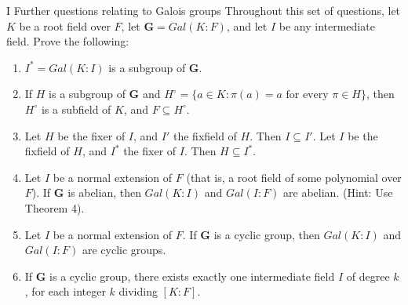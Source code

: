 \begin{exercise}{I Further questions relating to Galois groups}
Throughout this set of questions, let $K$ be a root field over $F$, let $\mathbf{G}=Gal(K:F)$, and let $I$ be any intermediate field. Prove the following:
\begin{enumerate}
    \item $I^\ast=Gal(K:I)$ is a subgroup of $\mathbf{G}$.
    \item If $H$ is a subgroup of $\mathbf{G}$ and $H^\circ=\{a\in K: \pi(a)=a\text{ for every }\pi\in H\}$, then $H^\circ$ is a subfield of $K$, and $F\subseteq H^\circ$.
    \item Let $H$ be the fixer of $I$, and $I'$ the fixfield of $H$. Then $I\subseteq I'$. Let $I$ be the fixfield of $H$, and $I^\ast$ the fixer of $I$. Then $H\subseteq I^\ast$.
    \item Let $I$ be a normal extension of $F$ (that is, a root field of some polynomial over $F$). If $\mathbf{G}$ is abelian, then $Gal(K:I)$ and $Gal(I:F)$ are abelian. (Hint: Use Theorem 4).
     \item Let $I$ be a normal extension of $F$. If $\mathbf{G}$ is a cyclic group, then $Gal(K:I)$ and $Gal(I:F)$ are cyclic groups.
     \item If $\mathbf{G}$ is a cyclic group, there exists exactly one intermediate field $I$ of degree $k$, for each integer $k$ dividing $[K:F]$.
\end{enumerate}
\end{exercise}
